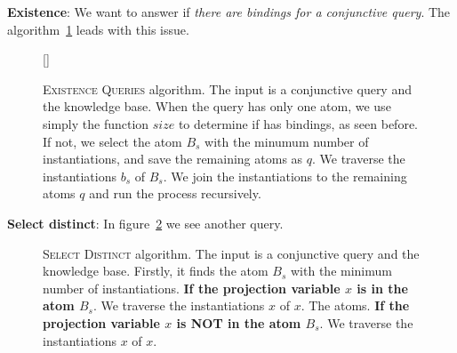 \documentclass{article}
\begin{document}
\noindent \textbf{Existence}: We want to answer if \textit{there are bindings
for a conjunctive query}. The algorithm~\ref{fig:existence_queries} leads with
this issue.

\begin{figure}[H]
\captionsetup{singlelinecheck=off}
\centering
    [\FBwidth]
    {\resizebox{!}{0.60\textheight}{%
    
    }}
    {
        \caption[]{\textsc{Existence Queries} algorithm.
        \newline \newline The input is a conjunctive query and the knowledge base.
        \newline \newline When the query has only one atom, we use simply the function $size$ to determine if has bindings, as seen before.
        \newline \newline If not, we select the atom $B_s$ with the minumum number of instantiations, and save the remaining atoms as $q$.
        \newline \newline We traverse the instantiations $b_s$ of $B_s$.
        \newline \newline We join the instantiations to the remaining atoms $q$ and run the process recursively.
        }
    \label{fig:existence_queries}
    }
\end{figure}

\noindent \textbf{Select distinct}: In figure~\ref{fig:select_distinct} we see
another query.

\begin{figure}[H]
\centering
    \resizebox{!}{0.65\textheight}{%
    
    }
    \caption[\textsc{Select Distinct} algorithm.]
    {\textsc{Select Distinct} algorithm.
        \newline \newline The input is a conjunctive query and the knowledge base.
        Firstly, it finds the atom $B_s$ with the minimum number of instantiations.
        \newline \newline \textbf{If the projection variable $x$ is in the atom $B_s$}. We traverse the instantiations $x$ of $x$.
        \newline \newline The atoms.
        \newline \newline \textbf{If the projection variable $x$ is NOT in the atom $B_s$}. We traverse the instantiations $x$ of $x$.
    }
    \label{fig:select_distinct}
\end{figure}
\end{document}
